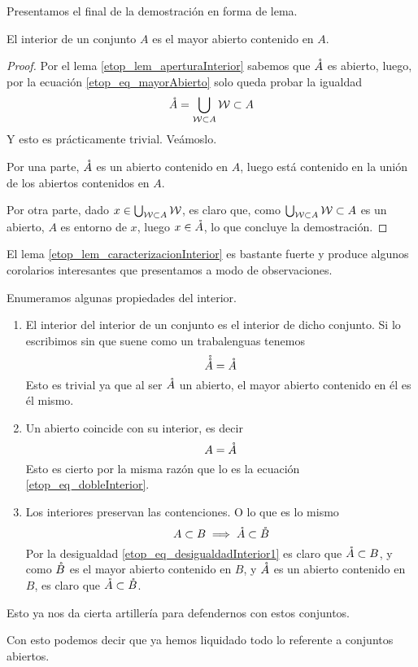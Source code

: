 Presentamos el final de la demostración en forma de lema.
\begin{lem}
	\label{etop_lem_caracterizacionInterior}
	El interior de un conjunto $A$ es el mayor abierto contenido en $A$.
\end{lem}
\begin{proof}
	Por el lema \ref{etop_lem_aperturaInterior} sabemos que $\mathring{A}$ es abierto, luego, por la ecuación \eqref{etop_eq_mayorAbierto} solo queda probar la igualdad
	\begin{equation*}
	\mathring{A}=\bigcup_{\mathcal{W}\subset A}\mathcal{W}\subset A
	\end{equation*}
	Y esto es prácticamente trivial. Veámoslo.
	
	Por una parte, $\mathring{A}$ es un abierto contenido en $A$, luego está contenido en la unión de los abiertos contenidos en $A$.
	
	Por otra parte, dado $x\in\bigcup_{\mathcal{W}\subset A}\mathcal{W}$, es claro que, como $\bigcup_{\mathcal{W}\subset A}\mathcal{W}\subset A$ es un abierto, $A$ es entorno de $x$, luego $x\in\mathring{A}$, lo que concluye la demostración.
\end{proof}

El lema \ref{etop_lem_caracterizacionInterior} es bastante fuerte y produce algunos corolarios interesantes que presentamos a modo de observaciones.
\begin{obs}
	\label{etop_obs_propiedadesInterior}
	Enumeramos algunas propiedades del interior.
	\begin{enumerate}
		\item El interior del interior de un conjunto es el interior de dicho conjunto. Si lo escribimos sin que suene como un trabalenguas tenemos
		\begin{equation}
		\label{etop_eq_dobleInterior}
		\mathring{\mathring{A}}=\mathring{A}
		\end{equation}
		Esto es trivial ya que al ser $\mathring{A}$ un abierto, el mayor abierto contenido en él es él mismo.
		\item Un abierto coincide con su interior, es decir
		\begin{equation}
		\label{etop_eq_abiertoInterior}
		A=\mathring{A}
		\end{equation}
		Esto es cierto por la misma razón que lo es la ecuación \eqref{etop_eq_dobleInterior}.
		\item Los interiores preservan las contenciones. O lo que es lo mismo
		\begin{equation}
		\label{etop_eq_interiorContencion}
		A\subset B\implies \mathring{A}\subset\mathring{B}
		\end{equation}
		Por la desigualdad \eqref{etop_eq_desigualdadInterior1} es claro que $\mathring{A}\subset B$, y como $\mathring{B}$ es el mayor abierto contenido en $B$, y $\mathring{A}$ es un abierto contenido en $B$, es claro que $\mathring{A}\subset\mathring{B}$.
	\end{enumerate}
	Esto ya nos da cierta artillería para defendernos con estos conjuntos.
\end{obs}
Con esto podemos decir que ya hemos liquidado todo lo referente a conjuntos abiertos.
